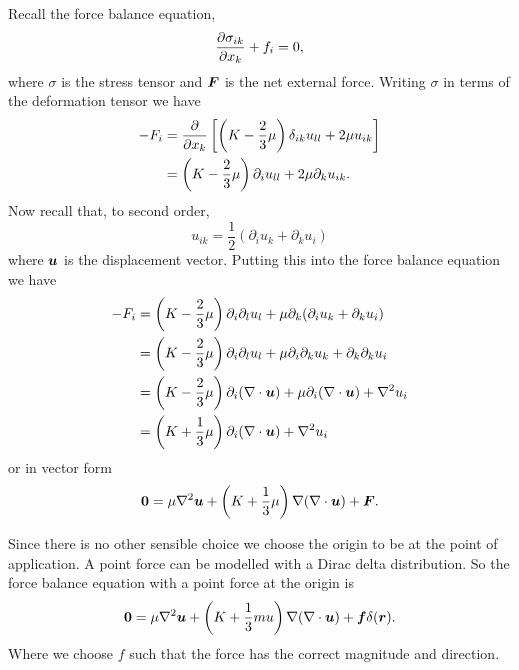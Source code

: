 \documentclass[a4paper]{article}
\begin{document}
    Recall the force balance equation,
    \[\pdv{\sigma_{ik}}{x_k} + f_i = 0,\]
    where \(\sigma\) is the stress tensor and \(\bm{F}\) is the net external force.
    Writing \(\sigma\) in terms of the deformation tensor we have
    \begin{align*}
        -F_i &= \pdv{x_k}\left[ \left( K - \frac{2}{3}\mu \right) \delta_{ik}u_{ll} + 2\mu u_{ik} \right]\\
        &= \left( K - \frac{2}{3}\mu \right) \partial_{i}u_{ll} + 2\mu\partial_{k}u_{ik}.
    \end{align*}
    Now recall that, to second order,
    \[u_{ik} = \frac{1}{2}(\partial_iu_k + \partial_ku_i)\]
    where \(\bm{u}\) is the displacement vector.
    Putting this into the force balance equation we have
    \begin{align*}
        -F_i &= \left( K - \frac{2}{3}\mu \right)\partial_i\partial_lu_l + \mu\partial_k(\partial_iu_k + \partial_ku_i)\\
        &= \left( K - \frac{2}{3}\mu \right) \partial_i\partial_lu_{l} + \mu \partial_i\partial_k u_k + \partial_k\partial_ku_i\\
        &= \left( K - \frac{2}{3}\mu \right)\partial_i(\nabla\cdot\bm{u}) + \mu\partial_i(\nabla\cdot\bm{u}) + \nabla^2 u_i\\
        &= \left( K + \frac{1}{3}\mu \right)\partial_i(\nabla\cdot\bm{u}) + \nabla^2 u_i
    \end{align*}
    or in vector form
    \[\bm{0} = \mu\nabla^2\bm{u} + \left( K + \frac{1}{3}\mu \right)\nabla(\nabla\cdot\bm{u}) + \bm{F}.\]
    
    Since there is no other sensible choice we choose the origin to be at the point of application.
    A point force can be modelled with a Dirac delta distribution.
    So the force balance equation with a point force at the origin is
    \[\bm{0} = \mu\nabla^2\bm{u} + \left( K + \frac{1}{3}mu \right)\nabla(\nabla\cdot\bm{u}) + \bm{f}\delta(\bm{r}).\]
    Where we choose \(f\) such that the force has the correct magnitude and direction.
    
\end{document}
